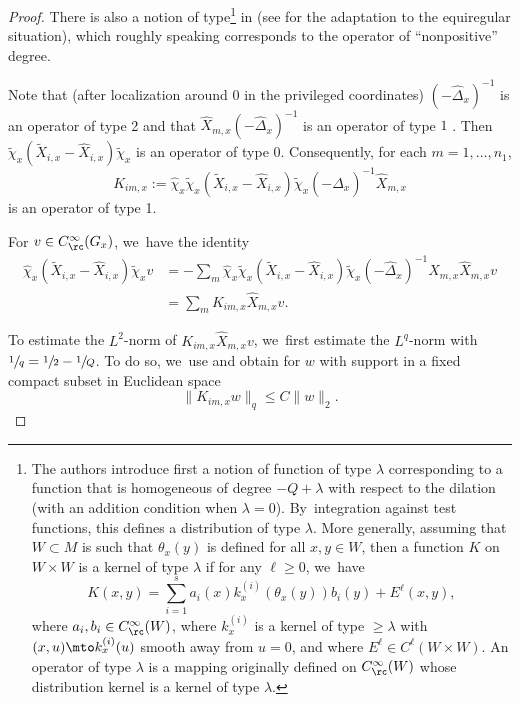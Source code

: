 \begin{proof}
There is also a notion of type\footnote{The authors introduce first a notion of function of type $\lambda$ corresponding to a function that is homogeneous of degree $-Q +\lambda$ with respect to the dilation (with an addition condition when $\lambda=0$). By~integration against test functions, this defines a distribution of type $\lambda$. More generally, assuming that $W\subset M$ is such that $\theta_x(y)$ is defined for all $x,y\in W$, then a function $K$ on $W\times W$ is a kernel of type $\lambda$ if for any $\ell \geq 0$, we~have
\[
K(x,y) = \sum_{i=1}^s a_i(x) k_x^{(i)} (\theta_x(y)) b_i(y) + E^\ell (x,y),
\]
where $a_i, b_i \in C_\rc^\infty(W)$, where $k_x^{(i)}$ is a kernel of type $\geq \lambda$ with $(x,u)\mto k_x^{(i)}(u)$ smooth away from $u=0$, and where $E^\ell \in C^\ell(W \times W)$. An operator of type $\lambda$ is a mapping originally defined on $C_\rc^\infty(W)$ whose distribution kernel is a kernel of type $\lambda$.}
in \cite{RS} (see \cite[pp.\,654--655]{Rot} for the adaptation to the equiregular situation), which roughly speaking corresponds to the operator of ``nonpositive'' degree.

Note that (after localization around $0$ in the privileged coordinates) $(-\widehat \Delta_x)^{-1}$ is an operator of type 2 and that $\widehat X_{m,x}(-\widehat \Delta_x)^{-1} $ is an operator of type $1$ \cite[Th.\,8]{RS}. Then $\tilde \chi_x (\tilde X_{i,x} -\widehat X_{i,x}) \tilde\chi_x$ is an operator of type 0. Consequently, for each $m=1,\ldots,n_1$,
\[
K_{im,x} := \widehat \chi_x \tilde \chi_x (\tilde X_{i,x} -\widehat X_{i,x}) \tilde\chi_x (-\widehat \Delta_x)^{-1} \widehat X_{m,x}
\]
is an operator of type 1.

For $v \in C_\rc^\infty (G_x)$, we~have the identity
\begin{align*}
\widehat \chi_x (\tilde X_{i,x} -\widehat X_{i,x}) \tilde\chi_x v & = - \sum_m \widehat \chi_x \tilde \chi_x (\tilde X_{i,x} -\widehat X_{i,x}) \tilde\chi_x (-\widehat \Delta_x)^{-1} \widehat X_{m,x} \widehat X_{m,x} v \\
& = \sum_m K_{im,x} \widehat X_{m,x} v.
\end{align*}

To estimate the $L^2$-norm of $ K_{im,x} \widehat X_{m,x} v$, we~first estimate the $L^q$-norm with $\sfrac 1q = \sfrac 12 - \sfrac 1Q$. To do so, we~use \cite[Th.\,7]{RS} and obtain for $w$ with support in a fixed compact subset in Euclidean space
\[
\| K_{im,x} w \|_q \leq C \| w \|_2.
\]


\end{proof}
